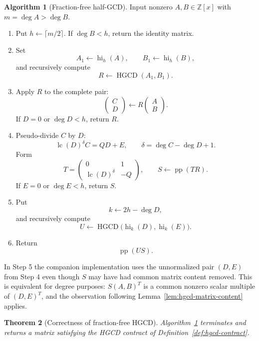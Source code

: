 \documentclass[11pt]{book}
\newtheorem{theorem}{Theorem}[section]
\theoremstyle{definition}
\newtheorem{algorithm}[theorem]{Algorithm}
\newcommand{\ZZ}{\mathbb Z}
\begin{document}
\begin{algorithm}[Fraction-free half-GCD]\label{alg:hgcd-pseudo}
Input nonzero $A,B\in\ZZ[x]$ with $m=\deg A>\deg B$.
\begin{enumerate}
 \item Put $h\leftarrow\lceil m/2\rceil$.  If $\deg B<h$, return the identity
 matrix.
 \item Set
 \[
  A_1\leftarrow\operatorname{hi}_h(A),
  \qquad
  B_1\leftarrow\operatorname{hi}_h(B),
 \]
 and recursively compute
 \[
  R\leftarrow\operatorname{HGCD}(A_1,B_1).
 \]
 \item Apply $R$ to the complete pair:
 \[
  \begin{pmatrix}C\\D\end{pmatrix}
  \leftarrow R\begin{pmatrix}A\\B\end{pmatrix}.
 \]
 If $D=0$ or $\deg D<h$, return $R$.
 \item Pseudo-divide $C$ by $D$:
 \[
  \operatorname{lc}(D)^\delta C=QD+E,
  \qquad
  \delta=\deg C-\deg D+1.
 \]
 Form
 \[
  T=
  \begin{pmatrix}
   0&1\\
   \operatorname{lc}(D)^\delta&-Q
  \end{pmatrix},
  \qquad
  S\leftarrow\operatorname{pp}(TR).
 \]
 If $E=0$ or $\deg E<h$, return $S$.
 \item Put
 \[
  k\leftarrow2h-\deg D,
 \]
 and recursively compute
 \[
  U\leftarrow
  \operatorname{HGCD}
  \bigl(\operatorname{hi}_k(D),\operatorname{hi}_k(E)\bigr).
 \]
 \item Return
 \[
  \operatorname{pp}(US).
 \]
\end{enumerate}
\end{algorithm}

In Step 5 the companion implementation uses the unnormalized pair $(D,E)$
from Step 4 even though $S$ may have had common matrix content removed.  This
is equivalent for degree purposes: $S(A,B)^T$ is a common nonzero scalar
multiple of $(D,E)^T$, and the observation following
Lemma~\ref{lem:hgcd-matrix-content} applies.

\begin{theorem}[Correctness of fraction-free HGCD]
\label{thm:hgcd-pseudo-correctness}
Algorithm~\ref{alg:hgcd-pseudo} terminates and returns a matrix satisfying the
HGCD contract of Definition~\ref{def:hgcd-contract}.
\end{theorem}
\end{document}
